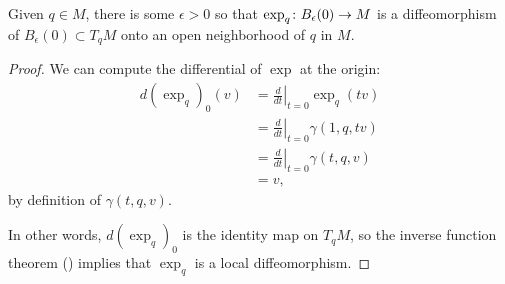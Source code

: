 \begin{theorem}\label{thm:exp is a local diffeo}
	Given $q \in M$, there is some $\epsilon > 0$ so that $\exp_q \colon\thinspace\! B_\epsilon(0) \to M$ is a diffeomorphism of $B_\epsilon(0) \subset T_q M$ onto an open neighborhood of $q$ in $M$.
\end{theorem}

\begin{proof}
	We can compute the differential of $\exp$ at the origin:
	\begin{align*}
		d(\exp_q)_0(v) & = \left. \frac{d}{dt} \right|_{t=0} \exp_q(tv) \\
		& = \left. \frac{d}{dt}\right|_{t=0} \gamma(1,q,tv) \\
		& = \left. \frac{d}{dt} \right|_{t=0} \gamma(t,q,v) \\
		& = v,
	\end{align*}
	by definition of $\gamma(t,q,v)$. 
	
	In other words, $d(\exp_q)_0$ is the identity map on $T_q M$, so the inverse function theorem () implies that $\exp_q$ is a local diffeomorphism.
\end{proof}